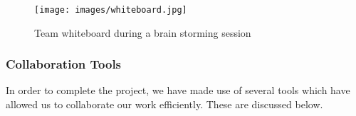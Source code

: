 \documentclass[11pt]{article}
\begin{document}
\begin{itemize}
\begin{figure}[H]
\begin{center}
\texttt{[image: images/whiteboard.jpg]}
\caption{Team whiteboard during a brain storming session}
\label{default}
\end{center}
\end{figure}  		
			
\end{itemize}

\subsubsection{Collaboration Tools}

In order to complete the project, we have made use of several tools which have
allowed us to collaborate our work efficiently. These are discussed below.
\end{document}
